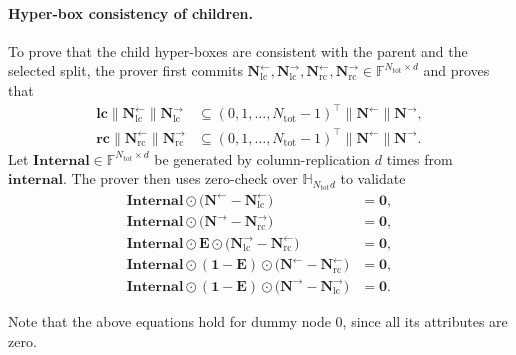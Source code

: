 \paragraph{Hyper-box consistency of children.}
To prove that the child hyper-boxes are consistent with the parent and the selected split,
    the prover first commits
    $\mathbf{N}^{\leftarrow}_{\mathrm{lc}}, \mathbf{N}^{\rightarrow}_{\mathrm{lc}},
    \mathbf{N}^{\leftarrow}_{\mathrm{rc}}, \mathbf{N}^{\rightarrow}_{\mathrm{rc}}
    \in \mathbb{F}^{N_{\mathrm{tot}}\times d}$
    and proves that
    \begin{align}
        \mathbf{lc}\| \mathbf{N}^{\leftarrow}_{\mathrm{lc}}\| \mathbf{N}^{\rightarrow}_{\mathrm{lc}}
        &\subseteq
        (0, 1, \dots, N_{\mathrm{tot}}-1)^\top\| \mathbf{N}^{\leftarrow}\| \mathbf{N}^{\rightarrow},\\
        \mathbf{rc}\| \mathbf{N}^{\leftarrow}_{\mathrm{rc}}\| \mathbf{N}^{\rightarrow}_{\mathrm{rc}}
        &\subseteq
        (0, 1, \dots, N_{\mathrm{tot}}-1)^\top\| \mathbf{N}^{\leftarrow}\| \mathbf{N}^{\rightarrow}.
    \end{align}
    Let $\mathbf{Internal}\in\mathbb{F}^{N_{\mathrm{tot}}\times d}$ be generated by
    column-replication $d$ times from $\mathbf{internal}$.
    The prover then uses zero-check over $\mathbb{H}_{N_{\mathrm{tot}}d}$ to validate
    \begin{align}
        \mathbf{Internal}\odot\bigl(\mathbf{N}^{\leftarrow}-\mathbf{N}^{\leftarrow}_{\mathrm{lc}}\bigr) &= \mathbf{0},\\
        \mathbf{Internal}\odot\bigl(\mathbf{N}^{\rightarrow}-\mathbf{N}^{\rightarrow}_{\mathrm{rc}}\bigr) &= \mathbf{0},\\
        \mathbf{Internal}\odot\mathbf{E}\odot
        \bigl(\mathbf{N}^{\rightarrow}_{\mathrm{lc}}-\mathbf{N}^{\leftarrow}_{\mathrm{rc}}\bigr) &= \mathbf{0},\\
        \mathbf{Internal}\odot(\mathbf{1}-\mathbf{E})\odot
        \bigl(\mathbf{N}^{\leftarrow}-\mathbf{N}^{\leftarrow}_{\mathrm{rc}}\bigr) &= \mathbf{0},\\
        \mathbf{Internal}\odot(\mathbf{1}-\mathbf{E})\odot
        \bigl(\mathbf{N}^{\rightarrow}-\mathbf{N}^{\rightarrow}_{\mathrm{lc}}\bigr) &= \mathbf{0}.
    \end{align}

    Note that the above equations hold for dummy node $0$,
    since all its attributes are zero.



